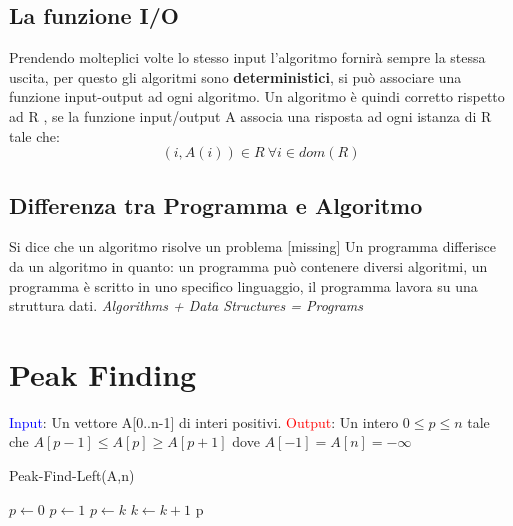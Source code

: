 \documentclass[twocolumn]{article}
\begin{document}
\subsection{La funzione I/O}
Prendendo molteplici volte lo stesso input l'algoritmo fornirà sempre la stessa uscita, per questo gli algoritmi sono \textbf{deterministici}, si può associare una funzione input-output ad ogni algoritmo.
\newline Un algoritmo è quindi corretto rispetto ad R , se la funzione input/output A associa una risposta ad ogni istanza di R tale che:
\newline \[(i,A(i)) \in R\ \forall i \in dom(R) \]
\subsection{Differenza tra Programma e Algoritmo}
Si dice che un algoritmo risolve un problema [missing]
Un programma differisce da un algoritmo in quanto: un programma può contenere diversi algoritmi, un programma è scritto in uno specifico linguaggio, il programma lavora su una struttura dati.
\newline \large \textit{Algorithms + Data Structures = Programs}
\section{Peak Finding}
\textcolor{blue}{Input}: Un vettore A[0..n-1] di interi positivi. \newline
\textcolor{red}{Output}: Un intero $0 \leq p \leq n$ tale che $A[p-1] \leq A[p] \geq A[p+1]$ dove $A[-1] = A[n] = -\infty$
\begin{algorithm}
\caption{Peak-Find-Left(A,n)}
    \begin{algorithmic}
\STATE $p\leftarrow0$
\STATE $p\leftarrow1$
    \STATE $p\leftarrow k$
    \STATE $k \leftarrow k+1$
\ENDWHILE
\RETURN p
    \end{algorithmic}
\end{algorithm}
\end{document}
